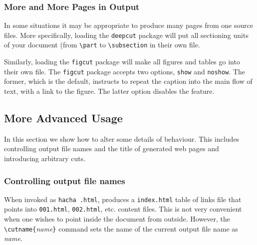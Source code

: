 \subsubsection{More and More Pages in Output}
%
In some situations it may be appropriate to produce many
pages from one source files.
More specifically, loading the \texttt{deepcut} package will put
all sectioning units of your document (from \verb+\part+ to
\verb+\subsection+ in their own file.

Similarly, loading the \texttt{figcut} package will make all figures
and tables go into their own file.
The \texttt{figcut} package accepts two options, \texttt{show} and
\texttt{noshow}. The former, which is the default, instructs \hevea{}
to repeat the caption into the main flow of text, with a link to the figure.
The latter option disables the feature.


\subsection{More Advanced Usage}
In this section we show how to alter some details of \hacha{}
behaviour.
This includes controlling output file names and the title of generated
web pages and introducing arbitrary cuts.

\subsubsection{Controlling\label{cutname} output file names}
%
%
When invoked as \texttt{hacha .html},
\hacha{} produces a \texttt{index.html} table of links file that
points into \texttt{001.html},
\texttt{002.html}, etc. content files.
This is not very convenient when one wishes to point inside the
document from outside.
However, the \verb+\cutname{+\textit{name}\verb+}+ command
sets the name of  the current output file name as \textit{name}.

